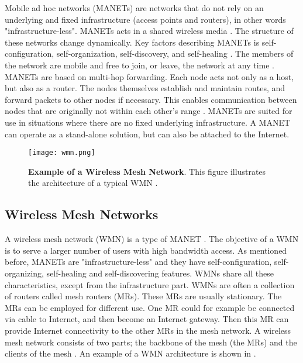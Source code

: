 Mobile ad hoc networks (MANETs) are networks that do not rely on an underlying and fixed infrastructure (access points and routers), in other words "infrastructure-less". MANETs acts in a shared wireless media \cite{adhoc}. The structure of these networks change dynamically. Key factors describing MANETs is self-configuration, self-organization, self-discovery, and self-healing \cite{wmn}. The members of the network are mobile and free to join, or leave, the network at any time \cite{adhoc2}. MANETs are based on multi-hop forwarding. Each node acts not only as a host, but also as a router. The nodes themselves establish and maintain routes, and forward packets to other nodes if necessary. This enables communication between nodes that are originally not within each other's range \cite{adhoc2}. MANETs are suited for use in situations where there are no fixed underlying infrastructure. A MANET can operate as a stand-alone solution, but can also be attached to the Internet. 

\begin{figure}[b]
  \centering
    \texttt{[image: wmn.png]}
     \caption [Example of a Wireless Mesh Network]{\textbf{Example of a Wireless Mesh Network}. This figure illustrates the architecture of a typical WMN \cite{wmn}.}
\label{fig:wmn}
\end{figure}

\subsection{Wireless Mesh Networks}
\label{subsec:mesh}
A wireless mesh network (WMN) is a type of MANET \cite{wmn}. The objective of a WMN is to serve a larger number of users with high bandwidth access. As mentioned before, MANETs are "infrastructure-less" and they have self-configuration, self-organizing, self-healing and self-discovering features. WMNs share all these characteristics, except from the infrastructure part. WMNs are often a collection of routers called mesh routers (MRs). These MRs are usually stationary. The MRs can be employed for different use. One MR could for example be connected via cable to Internet, and then become an Internet gateway. Then this MR can provide Internet connectivity to the other MRs in the mesh network. A wireless mesh network consists of two parts; the backbone of the mesh (the MRs) and the clients of the mesh \cite{wmn}. An example of a WMN architecture is shown in . 


